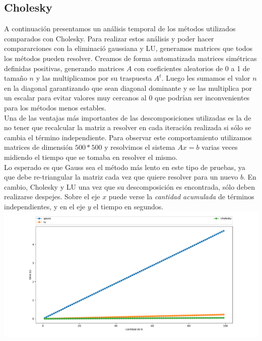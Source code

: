 \subsection{Cholesky}

A continuación presentamos un análisis temporal de los métodos utilizados comparados con Cholesky. Para realizar estos análisis y poder hacer compararciones con la eliminació gaussiana y LU, generamos matrices que todos los métodos pueden resolver. Creamos de forma automatizada matrices simétricas definidas positivas, generando matrices $A$ con coeficientes aleatorios de 0 a 1 de tamaño $n$ y las multiplicamos por su traspuesta $A^{t}$. Luego les sumamos el valor $n$ en la diagonal garantizando que sean diagonal dominante y se las multiplica por un escalar para evitar valores muy cercanos al 0 que podrían ser inconvenientes para los métodos menos estables. \\


Una de las ventajas más importantes de las descomposiciones utilizadas es la de no tener que recalcular la matriz a resolver en cada iteración realizada si sólo se cambia el término independiente. Para observar este comportamiento utilizamos matrices de dimensión $500*500$ y resolvimos el sistema $Ax = b$ varias veces midiendo el tiempo que se tomaba en resolver el mismo. \\

Lo esperado es que Gauss sea el método más lento en este tipo de pruebas, ya que debe re-triangular la matriz cada vez que quiere resolver para un nuevo $b$. En cambio, Cholesky y LU una vez que su descomposición es encontrada, sólo deben realizarse despejes. Sobre el eje $x$ puede verse la \textit{cantidad acumulada} de términos independientes, y en el eje $y$ el tiempo en segundos. \\
\hspace*{-2cm} \includegraphics[scale=0.55]{informe/imagenes/tytalus/DistintosBSuma-Dim500.pdf}

